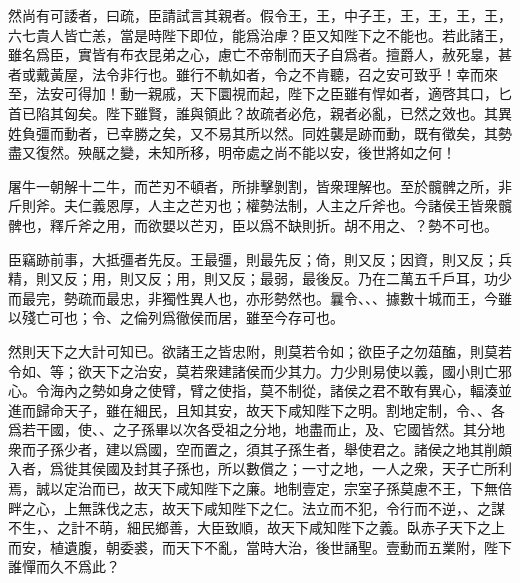 然尚有可諉者，曰疏，臣請試言其親者。假令王，王，中子王，王，王，王，王，六七貴人皆亡恙，當是時陛下即位，能爲治虖？臣又知陛下之不能也。若此諸王，雖名爲臣，實皆有布衣昆弟之心，慮亡不帝制而天子自爲者。擅爵人，赦死辠，甚者或戴黃屋，法令非行也。雖行不軌如者，令之不肯聽，召之安可致乎！幸而來至，法安可得加！動一親戚，天下圜視而起，陛下之臣雖有悍如者，適啓其口，匕首已陷其匈矣。陛下雖賢，誰與領此？故疏者必危，親者必亂，已然之效也。其異姓負彊而動者，已幸勝之矣，又不易其所以然。同姓襲是跡而動，既有徵矣，其勢盡又復然。殃旤之變，未知所移，明帝處之尚不能以安，後世將如之何！

屠牛一朝解十二牛，而芒刃不頓者，所排擊剝割，皆衆理解也。至於髖髀之所，非斤則斧。夫仁義恩厚，人主之芒刃也；權勢法制，人主之斤斧也。今諸侯王皆衆髖髀也，釋斤斧之用，而欲嬰以芒刃，臣以爲不缺則折。胡不用之、？勢不可也。

臣竊跡前事，大抵彊者先反。王最彊，則最先反；倚，則又反；因資，則又反；兵精，則又反；用，則又反；用，則又反；最弱，最後反。乃在二萬五千戶耳，功少而最完，勢疏而最忠，非獨性異人也，亦形勢然也。曩令、、、據數十城而王，今雖以殘亡可也；令、之倫列爲徹侯而居，雖至今存可也。

然則天下之大計可知已。欲諸王之皆忠附，則莫若令如；欲臣子之勿葅醢，則莫若令如、等；欲天下之治安，莫若衆建諸侯而少其力。力少則易使以義，國小則亡邪心。令海內之勢如身之使臂，臂之使指，莫不制從，諸侯之君不敢有異心，輻湊並進而歸命天子，雖在細民，且知其安，故天下咸知陛下之明。割地定制，令、、各爲若干國，使、、之子孫畢以次各受祖之分地，地盡而止，及、它國皆然。其分地衆而子孫少者，建以爲國，空而置之，須其子孫生者，舉使君之。諸侯之地其削頗入者，爲徙其侯國及封其子孫也，所以數償之；一寸之地，一人之衆，天子亡所利焉，誠以定治而已，故天下咸知陛下之廉。地制壹定，宗室子孫莫慮不王，下無倍畔之心，上無誅伐之志，故天下咸知陛下之仁。法立而不犯，令行而不逆，、之謀不生，、之計不萌，細民鄉善，大臣致順，故天下咸知陛下之義。臥赤子天下之上而安，植遺腹，朝委裘，而天下不亂，當時大治，後世誦聖。壹動而五業附，陛下誰憚而久不爲此？

